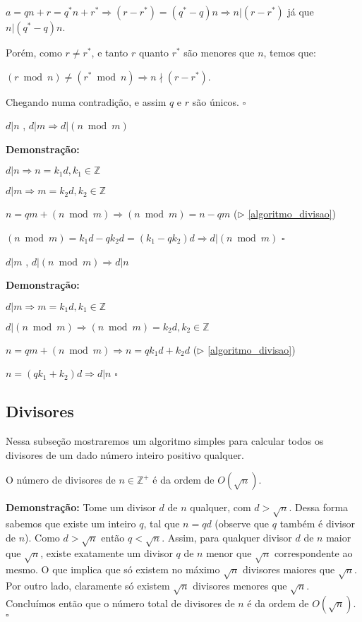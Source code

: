 $a = qn + r = q^*n + r^* \Rightarrow (r - r^*) = (q^* - q)n \Rightarrow n|(r - r^*)$ já que $n|(q^* - q)n$.

Porém, como $r \neq r^*$, e tanto $r$ quanto $r^*$ são menores que $n$, temos que: 

$(r\bmod n) \neq (r^*\bmod n) \Rightarrow n \nmid (r - r^*)$.

Chegando numa contradição, e assim $q$ e $r$ são únicos. $\square$ \\

\begin{corollary}\label{divisibilidade_modular}
$d|n$ , $d|m \Rightarrow d|(n \bmod m)$
\end{corollary}
\textbf{Demonstração:}

$d|n \Rightarrow n = k_1d, k_1 \in \mathbb{Z}$

$d|m \Rightarrow m = k_2d, k_2 \in \mathbb{Z}$

$n = qm + (n \bmod m) \Rightarrow (n \bmod m) = n - qm$ ($\triangleright$ \autoref{algoritmo_divisao})

$(n \bmod m) = k_1d - qk_2d = (k_1 - qk_2)d \Rightarrow d|(n \bmod m)$ $\square$


\begin{corollary}\label{divisibilidade_modular2}
$d|m$ , $d|(n \bmod m) \Rightarrow d|n$
\end{corollary}
\textbf{Demonstração:}

$d|m \Rightarrow m = k_1d, k_1 \in \mathbb{Z}$

$d|(n \bmod m) \Rightarrow (n \bmod m) = k_2d, k_2 \in \mathbb{Z}$

$n = qm + (n \bmod m) \Rightarrow n = qk_1d + k_2d$ ($\triangleright$ \autoref{algoritmo_divisao})

$n = (qk_1 + k_2)d \Rightarrow d|n$ $\square$


\subsection{Divisores}
Nessa subseção mostraremos um algoritmo simples para calcular todos os divisores de um dado número inteiro positivo qualquer.

\begin{theorem} 
O número de divisores de $n \in \mathbb{Z}^{+}$ é da ordem de $O(\sqrt{n})$.
\end{theorem}
\textbf{Demonstração:}
Tome um divisor $d$ de $n$ qualquer, com $d > \sqrt{n}$. Dessa forma sabemos que existe um inteiro $q$, tal que $n=qd$ (observe que $q$ também é divisor de $n$). 
Como $d > \sqrt{n}$ então $q < \sqrt{n}$. Assim, para qualquer divisor $d$ de $n$ maior que $\sqrt{n}$, existe exatamente um divisor $q$ de $n$ menor que $\sqrt{n}$ correspondente ao mesmo.
O que implica que só existem no máximo $\sqrt{n}$ divisores maiores que $\sqrt{n}$. Por outro lado, claramente só existem $\sqrt{n}$ divisores menores que $\sqrt{n}$.
Concluímos então que o número total de divisores de $n$ é da ordem de $O(\sqrt{n})$. $\square$
\\

